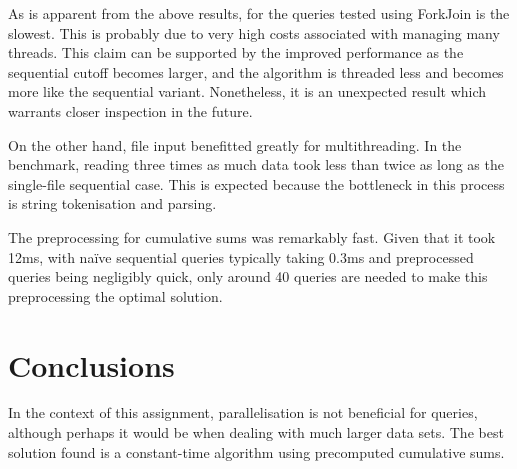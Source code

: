 \documentclass[a4paper,12pt]{article}
\begin{document}
As is apparent from the above results, for the queries tested using ForkJoin is the slowest.  This is probably due to very high costs associated with managing many threads.  This claim can be supported by the improved performance as the sequential cutoff becomes larger, and the algorithm is threaded less and becomes more like the sequential variant.  Nonetheless, it is an unexpected result which warrants closer inspection in the future.

On the other hand, file input benefitted greatly for multithreading.  In the benchmark, reading three times as much data took less than twice as long as the single-file sequential case.  This is expected because the bottleneck in this process is string tokenisation and parsing.

The preprocessing for cumulative sums was remarkably fast.  Given that it took 12ms, with na\"ive sequential queries typically taking 0.3ms and preprocessed queries being negligibly quick, only around 40 queries are needed to make this preprocessing the optimal solution.

\section{Conclusions}

In the context of this assignment, parallelisation is not beneficial for queries, although perhaps it would be when dealing with much larger data sets.  The best solution found is a constant-time algorithm using precomputed cumulative sums.
\end{document}

